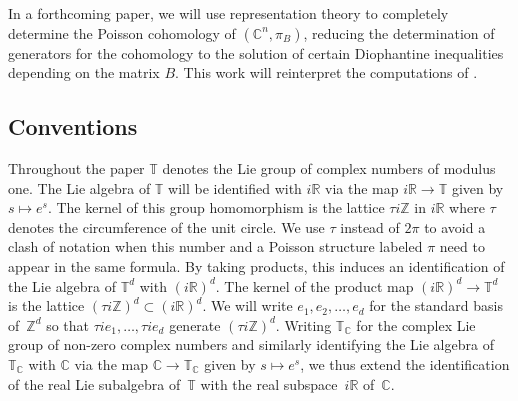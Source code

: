 \documentclass[10pt,a4paper]{amsart}
\numberwithin{equation}{section}
\begin{document}
In a forthcoming paper, we will use representation theory to completely determine the Poisson cohomology of $({\mathbb C}^n,\pi_B)$, reducing the determination of generators for the cohomology to the solution of certain Diophantine inequalities depending on the matrix $B$. This work will reinterpret the computations of \cite{Monnier}.

\subsection*{Conventions}

Throughout the paper ${\mathbb T}$ denotes the Lie group of complex numbers of modulus one. The Lie algebra of ${\mathbb T}$ will be identif\/ied with $i{\mathbb R}$ via the map $i{\mathbb R}\to{\mathbb T}$ given by $s\mapsto e^s$. The kernel of this group homomorphism is the lattice $\tau i{\mathbb Z}$ in $i{\mathbb R}$ where $\tau$ denotes the circumference of the unit circle. We use $\tau$ instead of $2\pi$ to avoid a clash of notation when this number and a Poisson structure labeled $\pi$ need to appear in the same formula. By taking products, this induces an identif\/ication of the Lie algebra of ${\mathbb T}^d$ with $(i{\mathbb R})^d$. The kernel of the product map $(i{\mathbb R})^d\to {\mathbb T}^d$ is the lattice $(\tau i{\mathbb Z})^d\subset(i{\mathbb R})^d$. We will write $e_1,e_2,\dots,e_d$ for the standard basis of~${\mathbb Z}^d$ so that $\tau i e_1,\dots,\tau ie_d$ generate $(\tau i{\mathbb Z})^d$. Writing ${\mathbb T}_{\mathbb C}$ for the complex Lie group of non-zero complex numbers and similarly identifying the Lie algebra of ${\mathbb T}_{\mathbb C}$ with ${\mathbb C}$ via the map ${\mathbb C}\to {\mathbb T}_{\mathbb C}$ given by $s\mapsto e^s$, we thus extend the identif\/ication of the real Lie subalgebra of~${\mathbb T}$ with the real subspace~$i{\mathbb R}$ of~${\mathbb C}$.
\end{document}
